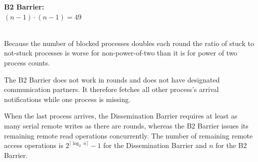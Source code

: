 \documentclass[a4paper, 10pt]{article}
\begin{document}
\begin{table}[htbp]
\begin{minipage}{0.42\linewidth}
{\begin{tabular}{c | c c c c c c c c}
		\end{tabular}
	}
\end{minipage}
\begin{minipage}{0.42\linewidth}
	\vspace{0.3cm}
	\textbf{B2 Barrier:} \\
	$(n-1) \cdot (n-1) = 49$ \\
	\vspace{-0.1cm} \\
\end{minipage}
\label{tab:table-dissemination-progress}
\end{table}

Because the number of blocked processes doubles each round the ratio of stuck to not-stuck processes is worse for non-power-of-two than it is for power of two process counts.

The B2 Barrier does not work in rounds and does not have designated communication partners. It therefore fetches all other process's arrival notifications while one process is missing.

When the last process arrives, the Dissemination Barrier requires at least as many serial remote writes as there are rounds, whereas the B2 Barrier issues its remaining remote read operations concurrently. The number of remaining remote access operations is $2^{\lceil \log_2~n \rceil} - 1$ for the Dissemination Barrier and $n$ for the B2 Barrier.
\end{document}
